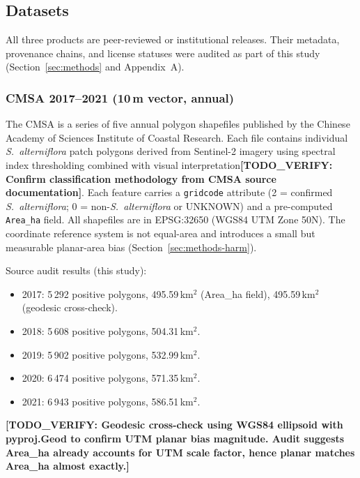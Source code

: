 \documentclass[11pt]{article}
\newcommand{\TODOVERIFY}[1]{\textcolor{todocolor}{\textbf{[TODO_VERIFY: #1]}}}
\begin{document}
\subsection{Datasets}



All three products are peer-reviewed or institutional releases. Their metadata,
provenance chains, and license statuses were audited as part of this study
(Section~\ref{sec:methods} and Appendix~A).

\subsubsection{CMSA 2017--2021 (10\,m vector, annual)}

The CMSA is a series of five annual polygon shapefiles published by the Chinese
Academy of Sciences Institute of Coastal Research. Each file contains individual
\textit{S.~alterniflora} patch polygons derived from Sentinel-2 imagery using
spectral index thresholding combined with visual interpretation\TODOVERIFY{Confirm
classification methodology from CMSA source documentation}. Each feature
carries a \texttt{gridcode} attribute (2 = confirmed \textit{S.~alterniflora};
0 = non-\textit{S.~alterniflora} or UNKNOWN) and a pre-computed \texttt{Area\_ha}
field. All shapefiles are in EPSG:32650 (WGS84 UTM Zone 50N). The coordinate
reference system is not equal-area and introduces a small but measurable
planar-area bias (Section~\ref{sec:methods-harm}).

Source audit results (this study):
\begin{itemize}[nosep]
\item 2017: 5\,292 positive polygons, 495.59\,km$^2$ (Area\_ha field), 495.59\,km$^2$ (geodesic cross-check).
\item 2018: 5\,608 positive polygons, 504.31\,km$^2$.
\item 2019: 5\,902 positive polygons, 532.99\,km$^2$.
\item 2020: 6\,474 positive polygons, 571.35\,km$^2$.
\item 2021: 6\,943 positive polygons, 586.51\,km$^2$.
\end{itemize}
\TODOVERIFY{Geodesic cross-check using WGS84 ellipsoid with pyproj.Geod to confirm
UTM planar bias magnitude. Audit suggests Area\_ha already accounts for UTM scale
factor, hence planar matches Area\_ha almost exactly.}
\end{document}
